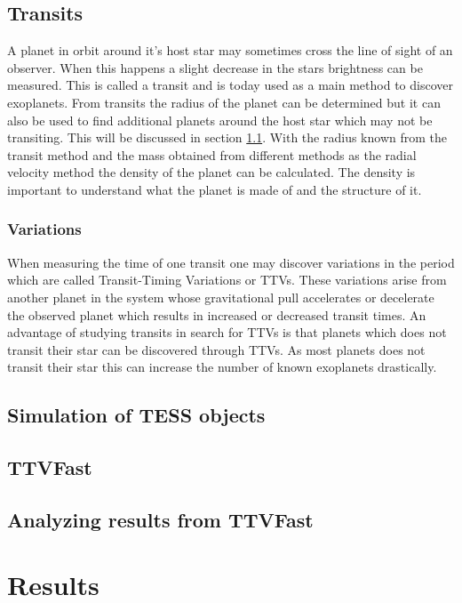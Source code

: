 \documentclass[12pt]{report}
\begin{document}
\section{Transits}
	A planet in orbit around it's host star may sometimes cross the line of sight of an observer. When this happens a slight decrease in the stars brightness can be measured. This is called a transit and is today used as a main method to discover exoplanets. From transits the radius of the planet can be determined but it can also be used to find additional planets around the host star which may not be transiting. This will be discussed in section \ref{sec:trans_vari}. With the radius known from the transit method and the mass obtained from different methods as the radial velocity method the density of the planet can be calculated. The density is important to understand what the planet is made of and the structure of it.

\subsection{Variations}
\label{sec:trans_vari}

	When measuring the time of one transit one may discover variations in the period which are called Transit-Timing Variations or TTVs. These variations arise from another planet in the system whose gravitational pull accelerates or decelerate the observed planet which results in increased or decreased transit times. An advantage of studying transits in search for TTVs is that planets which does not transit their star can be discovered through TTVs. As most planets does not transit their star this can increase the number of known exoplanets drastically.

\section{Simulation of TESS objects}

\section{TTVFast}

\section{Analyzing results from TTVFast}



\chapter{Results}
\end{document}
